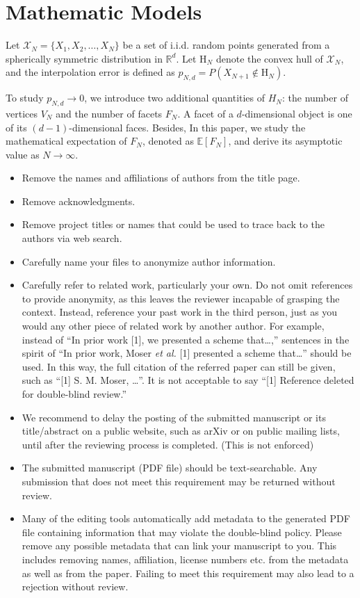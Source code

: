 \documentclass[conference,a4paper]{IEEEtran}
\def\E{\mathbb{E}}
\begin{document}
\section{Mathematic Models}
\label{sec:int_f}

Let $\mathcal{X}_N = \{X_1, X_2, \dots, X_N\}$ be a set of i.i.d. random points generated from
a spherically symmetric distribution in $\mathbb{R}^d$.
Let $\mathrm{H}_N$ denote the convex hull of $\mathcal{X}_N$,
and the interpolation error is defined as $p_{N,d}=P(X_{N+1} \not\in \mathrm{H}_N)$.

To study $p_{N,d} \to 0$, we introduce two additional quantities of $H_N$: the number of vertices
$V_N$ and the number of facets $F_N$.
A facet of a $d$-dimensional object is one of its $(d-1)$-dimensional faces.
Besides, 
In this paper, we study the mathematical expectation
of $F_N$, denoted as $\E[F_N]$, and derive its asymptotic value as $N\to \infty$.

\begin{itemize}
\item Remove the names and affiliations of authors from the title
  page.
\item Remove acknowledgments.
\item Remove project titles or names that could be used to trace back
  to the authors via web search.  
\item Carefully name your files to anonymize author information.
\item Carefully refer to related work, particularly your own. Do not
  omit references to provide anonymity, as this leaves the reviewer
  incapable of grasping the context. Instead, reference your past work
  in the third person, just as you would any other piece of related
  work by another author. For example, instead of ``In prior work [1],
  we presented a scheme that\ldots,'' sentences in the spirit of ``In
  prior work, Moser \emph{et al.} [1] presented a scheme that\ldots''
  should be used. In this way, the full citation of the referred paper
  can still be given, such as ``[1] S. M. Moser, \ldots''.  It is not
  acceptable to say ``[1] Reference deleted for double-blind review.''
\item We recommend to delay the posting of the submitted manuscript or
  its title/abstract on a public website, such as arXiv or on public
  mailing lists, until after the reviewing process is completed. (This
  is not enforced)
\item The submitted manuscript (PDF file) should be
  text-searchable. Any submission that does not meet this requirement
  may be returned without review.
\item Many of the editing tools automatically add metadata to the
  generated PDF file containing information that may violate the
  double-blind policy. Please remove any possible metadata that can
  link your manuscript to you. This includes removing names,
  affiliation, license numbers etc. from the metadata as well as from
  the paper. Failing to meet this requirement may also lead to a
  rejection without review.
\end{itemize}
\end{document}
